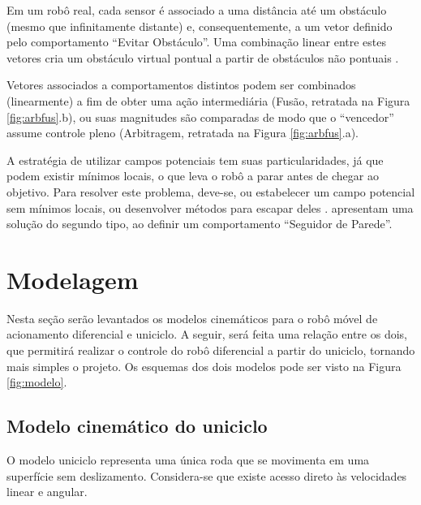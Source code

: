 

Em um robô real, cada sensor é associado a uma distância até um obstáculo
(mesmo que infinitamente distante) e, consequentemente, a um vetor definido pelo
comportamento ``Evitar Obstáculo''. Uma combinação linear entre estes vetores
cria um obstáculo virtual pontual a partir de obstáculos não pontuais
\cite{art:wallfollowing}. 

Vetores associados a comportamentos distintos podem ser combinados (linearmente)
a fim de obter uma ação intermediária (Fusão, retratada na Figura
\ref{fig:arbfus}.b), ou suas magnitudes são comparadas de modo que o
``vencedor'' assume controle pleno (Arbitragem, retratada na Figura
\ref{fig:arbfus}.a). 

A estratégia de utilizar campos potenciais tem suas particularidades, já que
podem existir mínimos locais, o que leva o robô a parar antes de chegar ao
objetivo. Para resolver este problema, deve-se, ou estabelecer um campo
potencial sem mínimos locais, ou desenvolver métodos para escapar deles
\cite{art:wallfollowing}.  apresentam uma solução
do segundo tipo, ao definir um comportamento ``Seguidor de Parede''.

%

\section{Modelagem}

Nesta seção serão levantados os modelos cinemáticos para o robô móvel de
acionamento diferencial e uniciclo. A seguir, será feita uma relação entre os
dois, que permitirá realizar o controle do robô diferencial a partir do
uniciclo, tornando mais simples o projeto. Os esquemas dos dois modelos pode ser
visto na Figura \ref{fig:modelo}.



	\subsection{Modelo cinemático do uniciclo}

O modelo uniciclo representa uma única roda que se movimenta em uma
superfície sem deslizamento. Considera-se que existe acesso direto às
velocidades linear e angular. 

